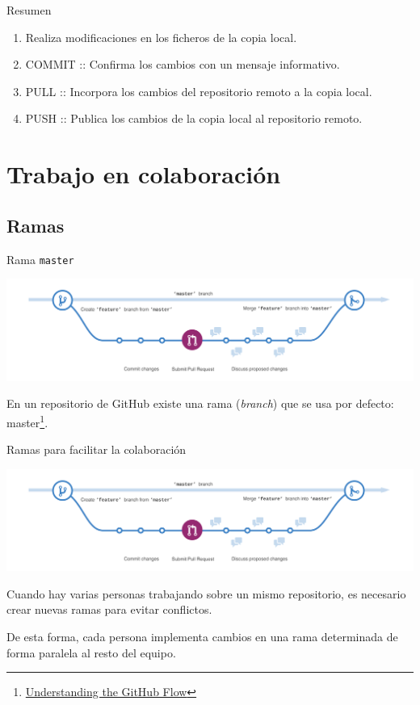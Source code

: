 \documentclass[xcolor={usenames,svgnames,dvipsnames}]{beamer}
\begin{document}
\begin{frame}[label={sec:org9be598f}]{Resumen}
\begin{enumerate}
\item Realiza modificaciones en los ficheros de la copia local.
\item \alert{COMMIT} :: Confirma los cambios con un mensaje informativo.
\item \alert{PULL} :: Incorpora los cambios del repositorio remoto a la copia local.
\item \alert{PUSH} :: Publica los cambios de la copia local al repositorio remoto.
\end{enumerate}
\end{frame}
\section{Trabajo en colaboración}
\label{sec:org10b621d}
\subsection{Ramas}
\label{sec:org3d2dab0}

\begin{frame}[label={sec:org3644602},fragile]{Rama \texttt{master}}
 \begin{center}
\includegraphics[width=.9\linewidth]{figs/branching.png}
\end{center}

En un repositorio de GitHub existe una rama (\emph{branch}) que se usa por defecto: \alert{master}\footnote{\href{https://guides.github.com/introduction/flow/}{Understanding the GitHub Flow}}.
\end{frame}

\begin{frame}[label={sec:orge925fd5}]{Ramas para facilitar la colaboración}
\begin{center}
\includegraphics[width=.9\linewidth]{figs/branching.png}
\end{center}

Cuando hay varias personas trabajando sobre un mismo repositorio, es necesario crear nuevas ramas para evitar conflictos. 

De esta forma, cada persona implementa \alert{cambios} en una \alert{rama determinada} de forma paralela al resto del equipo.
\end{frame}
\end{document}
